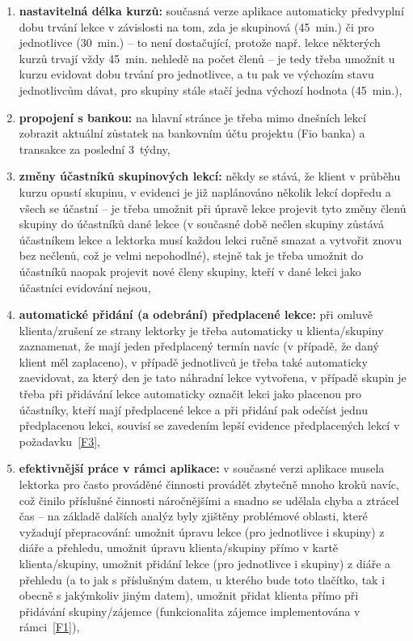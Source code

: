 \begin{enumerate}[label=\textbf{F\arabic*}]
    \item \label{F7} \textbf{nastavitelná délka kurzů:} současná verze aplikace automaticky předvyplní dobu trvání lekce v závislosti na tom, zda je skupinová (45~min.) či pro jednotlivce (30~min.) -- to není dostačující, protože např. lekce některých kurzů trvají vždy 45~min. nehledě na počet členů -- je tedy třeba umožnit u kurzu evidovat dobu trvání pro jednotlivce, a tu pak ve výchozím stavu jednotlivcům dávat, pro skupiny stále stačí jedna výchozí hodnota (45~min.),
    \item \label{F8} \textbf{propojení s bankou:} na hlavní stránce je třeba mimo dnešních lekcí zobrazit aktuální zůstatek na bankovním účtu projektu (Fio banka) a transakce za poslední 3~týdny,
    \item \label{F9} \textbf{změny účastníků skupinových lekcí:} někdy se stává, že klient v průběhu kurzu opustí skupinu, v evidenci je již naplánováno několik lekcí dopředu a všech se účastní -- je třeba umožnit při úpravě lekce projevit tyto změny členů skupiny do účastníků dané lekce (v současné době nečlen skupiny zůstává účastníkem lekce a lektorka musí každou lekci ručně smazat a vytvořit znovu bez nečlenů, což je velmi nepohodlné), stejně tak je třeba umožnit do účastníků naopak projevit nové členy skupiny, kteří v dané lekci jako účastníci evidování nejsou,
    \item \label{F10} \textbf{automatické přidání (a odebrání) předplacené lekce:} při omluvě klienta/zrušení ze strany lektorky je třeba automaticky u klienta/skupiny zaznamenat, že mají jeden předplacený termín navíc (v případě, že daný klient měl zaplaceno), v případě jednotlivců je třeba také automaticky zaevidovat, za který den je tato náhradní lekce vytvořena, v případě skupin je třeba při přidávání lekce automaticky označit lekci jako placenou pro účastníky, kteří mají předplacené lekce a při přidání pak odečíst jednu předplacenou lekci, souvisí se zavedením lepší evidence předplacených lekcí v požadavku~\ref{F3},
    \item \label{F11} \textbf{efektivnější práce v rámci aplikace:} v současné verzi aplikace musela lektorka pro často prováděné činnosti provádět zbytečně mnoho kroků navíc, což činilo příslušné činnosti náročnějšími a snadno se udělala chyba a ztrácel čas -- na základě dalších analýz byly zjištěny problémové oblasti, které vyžadují přepracování: umožnit úpravu lekce (pro jednotlivce i skupiny) z diáře a přehledu, umožnit úpravu klienta/skupiny přímo v kartě klienta/skupiny, umožnit přidání lekce (pro jednotlivce i skupiny) z diáře a přehledu (a to jak s příslušným datem, u kterého bude toto tlačítko, tak i obecně s jakýmkoliv jiným datem), umožnit přidat klienta přímo při přidávání skupiny/zájemce (funkcionalita zájemce implementována v rámci~\ref{F1}),

\end{enumerate}
